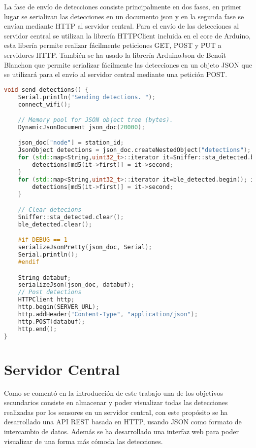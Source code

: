 \documentclass[../proyecto.tex]{subfiles}
\begin{document}
La fase de envío de detecciones consiste principalmente en dos fases, en primer lugar se serializan las detecciones en un documento json  y en la segunda fase se envían mediante HTTP al servidor central. Para el envío de las detecciones al servidor central se utilizan la librería HTTPClient incluida en el core de Arduino, esta libería permite realizar fácilmente peticiones GET, POST y PUT a servidores HTTP. También se ha usado la librería ArduinoJson de Benoît Blanchon que permite serializar fácilmente las detecciones en un objeto JSON que se utilizará para el envío al servidor central mediante una petición POST.

\begin{minipage}{\linewidth}
\begin{lstlisting}[language=C++, caption=Envío de detecciones al servidor central , captionpos=b, frame=single]
void send_detections() {
    Serial.println("Sending detections. ");
    connect_wifi();

    // Memory pool for JSON object tree (bytes).
    DynamicJsonDocument json_doc(20000);

    json_doc["node"] = station_id;
    JsonObject detections = json_doc.createNestedObject("detections");
    for (std::map<String,uint32_t>::iterator it=Sniffer::sta_detected.begin(); it!=Sniffer::sta_detected.end(); ++it) {
        detections[md5(it->first)] = it->second;
    }
    for (std::map<String,uint32_t>::iterator it=ble_detected.begin(); it!=ble_detected.end(); ++it) {
        detections[md5(it->first)] = it->second;
    }

    // Clear detecions
    Sniffer::sta_detected.clear();
    ble_detected.clear();

    #if DEBUG == 1
    serializeJsonPretty(json_doc, Serial);
    Serial.println();
    #endif

    String databuf;
    serializeJson(json_doc, databuf);
    // Post detections
    HTTPClient http;
    http.begin(SERVER_URL);
    http.addHeader("Content-Type", "application/json");
    http.POST(databuf);
    http.end();
}
\end{lstlisting}
\end{minipage}

\section{Servidor Central}

Como se comentó en la introducción de este trabajo una de los objetivos secundarios consiste en almacenar y poder visualizar todas las detecciones realizadas por los sensores en un servidor central, con este propósito se ha desarrollado una API REST basada en HTTP, usando JSON como formato de intercambio de datos. Además se ha desarrollado una interfaz web para poder visualizar de una forma más cómoda las detecciones.\\
\end{document}
